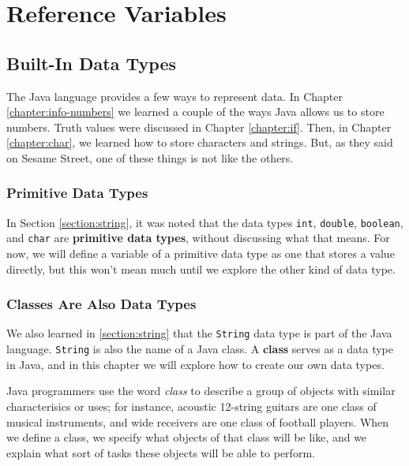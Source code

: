 
\chapter{Reference Variables}
\label{chapter:reference-variables}

\minitoc

\section{Built-In Data Types}

The Java language provides a few ways to represent data.  In Chapter \ref{chapter:info-numbers} we learned a couple of the ways Java allows us to store numbers.  Truth values were discussed in Chapter \ref{chapter:if}.  Then, in Chapter \ref{chapter:char}, we learned how to store characters and strings.  But, as they said on Sesame Street, one of these things is not like the others.

\subsection{Primitive Data Types}

In Section \ref{section:string}, it was noted that the data types \texttt{int}, \texttt{double}, \texttt{boolean}, and \texttt{char} are \textbf{primitive data types}, without discussing what that means.  For now, we will define a variable of a primitive data type as one that stores a value directly, but this won't mean much until we explore the other kind of data type.

\subsection{Classes Are Also Data Types}
We also learned in \ref{section:string} that the \texttt{String} data type is part of the Java language.  \texttt{String} is also the name of a Java class.  A \textbf{class} serves as a data type in Java, and in this chapter we will explore how to create our own data types.

Java programmers use the word \textit{class} to describe a group of objects with similar characterisics or uses; for instance, acoustic 12-string guitars are one class of musical instruments, and wide receivers are one class of football players.  When we define a class, we specify what objects of that class will be like, and we explain what sort of tasks these objects will be able to perform.

